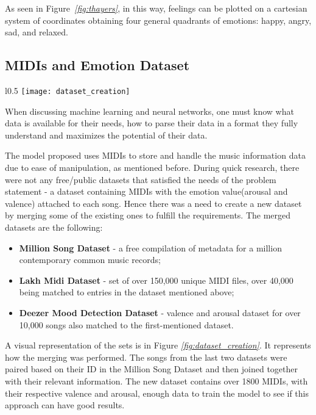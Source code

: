 As seen in Figure\emph{~\ref{fig:thayers}}, in this way,
feelings can be plotted on a cartesian system of coordinates obtaining
four general quadrants of emotions: happy, angry, sad, and relaxed.

\vspace{1cm}


\subsection{MIDIs and Emotion Dataset}

\begin{wrapfigure}[13]{l}{0.5\textwidth}
      \centering
      \texttt{[image: dataset\_creation]}
      \caption{\emph{Merging existing datasets to create a new one}}
      \label{fig:dataset_creation}
\end{wrapfigure}

When discussing machine learning and neural networks,
one must know what data is available for their needs,
how to parse their data in a format they fully understand and maximizes
the potential of their data.

The model proposed uses MIDIs to store and handle the music information
data due to ease of manipulation, as mentioned before.
During quick research, there were not any free/public datasets
that satisfied the needs of the problem statement - a
dataset containing MIDIs with the emotion value(arousal and valence)
attached to each song. Hence there was a need to create a new dataset
by merging some of the existing ones to fulfill the requirements.
The merged datasets are the following:
\begin{itemize}
      \item{
            \textbf{Million Song Dataset} - a free compilation of metadata for a million contemporary common music records;\cite{themillion}
            }
      \item{
            \textbf{Lakh Midi Dataset} - set of over 150,000 unique MIDI files, over 40,000 being matched to entries in the dataset mentioned above;\cite{lakh}
            }
      \item{
            \textbf{Deezer Mood Detection Dataset} - valence and arousal dataset for over 10,000 songs also matched to the first-mentioned dataset.\cite{deezer}
            }
\end{itemize}



A visual representation of the sets is in Figure \emph{\ref{fig:dataset_creation}}.
It represents how the merging was performed.
The songs from the last two datasets were paired based on their
ID in the Million Song Dataset and then joined together with their relevant information.
The new dataset contains over 1800 MIDIs, with their respective valence and arousal,
enough data to train the model to see if this approach can have good results.

